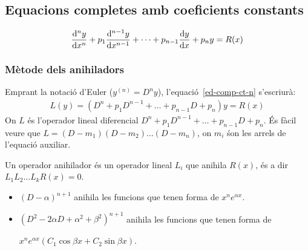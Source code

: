 \subsection{Equacions completes amb coeficients constants}
\begin{defi}
	\begin{align}\label{ed-comp-ct-n}
		\frac{\mathrm{d}^{n} y}{\mathrm{d} x^{n}} + p_{1} \frac{\mathrm{d}^{n-1} y}{\mathrm{d} x^{n-1}} + \dots + p_{n-1} \frac{\mathrm{d} y}{\mathrm{d} x} + p_{n} y = R(x)
	\end{align}
\end{defi}
\subsubsection*{Mètode dels anihiladors}
\begin{defi}
    Emprant la notació d'Euler ($y^{(n)} = D^{n}y$), l'equació~\eqref{ed-comp-ct-n} s'escriurà:
    \begin{align}
        L(y) = (D^{n} + p_{1} D^{n-1} + \dots + p_{n-1} D + p_{n}) y = R(x)
    \end{align}
    On $L$ és l'operador lineal diferencial $D^{n} + p_{1} D^{n-1} + \dots + p_{n-1} D + p_{n}$. És fàcil veure que $L = (D-m_{1}) (D-m_{2}) \dots (D-m_{n})$, on $m_{i}$ śon les arrels de l'equació auxiliar.
\end{defi}
\begin{defi}
Un operador anihilador és un operador lineal $L_{i}$ que anihila $R(x)$, és a dir $L_{1} L_{2} \dots L_{k} R(x) = 0$.
\begin{itemize}
    \item $\boxed{(D-\alpha)^{n+1}}$ anihila les funcions que tenen forma de $\boxed{x^{n} e^{\alpha x}}$.
    \item $\boxed{(D^{2}-2\alpha D + \alpha^{2} + \beta^{2})^{n+1}}$ anihila les funcions que tenen forma de

    $\boxed{x^{n} e^{\alpha x} (C_{1} \cos \beta x + C_{2} \sin \beta x)}$.
\end{itemize}
\end{defi}
